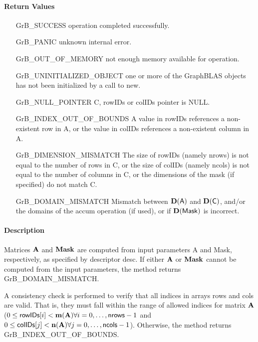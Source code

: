 \paragraph{Return Values}

\begin{itemize}[leftmargin=2.1in]
\item[{\sf GrB\_SUCCESS}]     operation completed successfully.
\item[{\sf GrB\_PANIC}]        unknown internal error.
\item[{\sf GrB\_OUT\_OF\_MEMORY}]    not enough memory available for operation.
\item[{\sf GrB\_UNINITIALIZED\_OBJECT}]   one or more of the GraphBLAS objects has
                             not been initialized by a call to {\sf new}.
\item[{\sf GrB\_NULL\_POINTER}]    {\sf C}, {\sf rowIDs} or {\sf colIDs} pointer is {\sf NULL}.

\item[{\sf GrB\_INDEX\_OUT\_OF\_BOUNDS}]
        A value in {\sf rowIDs} references a non-existent row in {\sf A}, or
        the value in {\sf colIDs} references a non-existent column in {\sf A}.
\item[{\sf GrB\_DIMENSION\_MISMATCH}] 
        The size of {\sf rowIDs} (namely {\sf nrows}) is not equal to the number of rows in {\sf C}, or
        the size of {\sf colIDs} (namely {\sf ncols}) is not equal to the number of columns in {\sf C}, or
        the dimensions of the mask (if specified) do not match {\sf C}.
\item[{\sf GrB\_DOMAIN\_MISMATCH}]    Mismatch between $\bold{D}({\sf A})$ and $\bold{D}({\sf C})$, 
                                      and/or the domains of the 
                                      {\sf accum} operation (if used), or if $\bold{D}(\sf Mask)$ is incorrect.
\end{itemize}


\paragraph{Description}

Matrices ${\bf A}$ and ${\bf Mask}$ are computed from input
parameters {\sf A} and {\sf Mask}, respectively, as specified by
descriptor {\sf desc}.  If either ${\bf A}$ or ${\bf Mask}$
cannot be computed from the input parameters, the method returns {\sf
GrB\_DOMAIN\_MISMATCH}.

A consistency check is performed to verify that all indices in arrays
{\sf rows} and {\sf cols} are valid. That is, they must fall within the range of allowed
indices for matrix ${\bf A}$ ($0 \leq {\sf rowIDs}[i] < \bold{m}({\bf A})
\forall i = 0,\ldots,{\sf nrows}-1$ and
$0 \leq {\sf colIDs}[j] < \bold{n}({\bf A}) \forall j = 0,\ldots,{\sf ncols}-1$).  Otherwise, the method returns {\sf
GrB\_INDEX\_OUT\_OF\_BOUNDS}.

